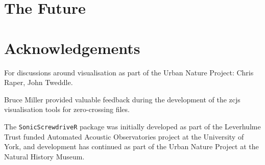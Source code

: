 \documentclass[
]{book}
\begin{document}
\hypertarget{the-future}{%
\chapter{The Future}\label{the-future}}

\hypertarget{acknowledgements}{%
\chapter{Acknowledgements}\label{acknowledgements}}

For discussions around visualisation as part of the Urban Nature Project: Chris Raper, John Tweddle.

Bruce Miller provided valuable feedback during the development of the zcjs visualisation tools for zero-crossing files.

The \texttt{SonicScrewdriveR} package was initially developed as part of the Leverhulme Trust funded Automated Acoustic Observatories project at the University of York, and development has continued as part of the Urban Nature Project at the Natural History Museum.

  
\end{document}
